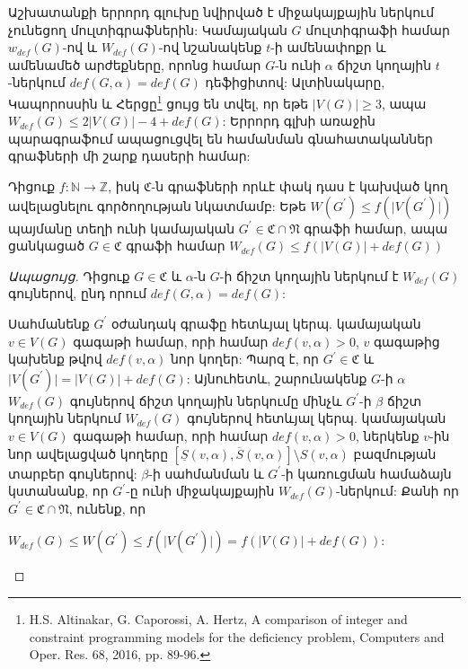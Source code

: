 Աշխատանքի երրորդ գլուխը նվիրված է միջակայքային ներկում չունեցող մուլտիգրաֆներին: Կամայական $G$ մուլտիգրաֆի համար $w_{def}(G)$-ով և $W_{def}(G)$-ով նշանակենք $t$-ի ամենափոքր և ամենամեծ արժեքները, որոնց համար $G$-ն ունի $\alpha$ ճիշտ կողային $t$-ներկում $def(G,\alpha)=def(G)$ դեֆիցիտով: Ալտինակարը, Կապորոսսին և Հերցը\footnote{H.S. Altinakar, G. Caporossi, A. Hertz, A comparison of integer and constraint programming models for the deficiency problem, Computers and Oper. Res. 68, 2016, pp. 89-96.} ցույց են տվել, որ եթե $|V(G)|\geq 3$, ապա $W_{def}(G)\leq 2\vert V(G)\vert -4+def(G)$: Երրորդ գլխի առաջին պարագրաֆում ապացուցվել են համանման գնահատականներ գրաֆների մի շարք դասերի համար:

\begin{theorem}
\label{t3_W_Wdef} Դիցուք $f:\mathbb{N} \rightarrow \mathbb{Z}$, իսկ $\mathfrak{C}$-ն գրաֆների որևէ փակ դաս է կախված կող ավելացնելու գործողության նկատմամբ: Եթե
$W(G^{\prime})\leq
f(\vert V(G^{\prime})\vert)$ պայմանը տեղի ունի կամայական $G^{\prime}\in
\mathfrak{C} \cap \mathfrak{N}$ գրաֆի համար, ապա ցանկացած $G\in \mathfrak{C}$ գրաֆի համար $W_{def}(G)\leq f\left(\vert V(G)\vert+def(G)\right)$
\end{theorem}
\begin{proof}[Ապացույց]
Դիցուք $G\in \mathfrak{C}$ և $\alpha$-ն $G$-ի ճիշտ կողային ներկում է $W_{def}(G)$ գույներով, ընդ որում $def(G,\alpha)=def(G)$:

Սահմանենք $G^{\prime}$ օժանդակ գրաֆը հետևյալ կերպ. կամայական $v\in V(G)$ գագաթի համար, որի համար $def(v,\alpha)>0$, $v$ գագաթից կախենք թվով $def(v,\alpha)$ նոր կողեր: Պարզ է, որ $G^{\prime}\in\mathfrak{C}$ և $\vert V(G^{\prime})\vert = \vert V(G)\vert +def(G)$: Այնուհետև, շարունակենք $G$-ի $\alpha$ $W_{def}(G)$ գույներով ճիշտ կողային ներկումը մինչև $G^{\prime}$-ի $\beta$ ճիշտ կողային ներկում $W_{def}(G)$ գույներով հետևյալ կերպ. կամայական $v\in V(G)$ գագաթի համար, որի համար $def(v,\alpha)>0$, ներկենք $v$-ին նոր ավելացված կողերը $\left[\underline
S\left(v,\alpha \right),\overline S\left(v,\alpha
\right)\right]\setminus S(v,\alpha)$ բազմության տարբեր գույներով: $\beta$-ի սահմանման և $G^{\prime}$-ի կառուցման համաձայն կստանանք, որ $G^{\prime}$-ը ունի միջակայքային $W_{def}(G)$-ներկում: Քանի որ $G^{\prime}\in \mathfrak{C}\cap\mathfrak{N}$, ունենք, որ
\begin{center}
$W_{def}(G)\leq W(G^{\prime})\leq f(\vert V(G^{\prime})\vert)= f\left(\vert V(G)\vert+def(G)\right)$:
\end{center}
\end{proof}

